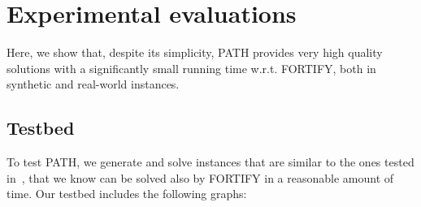 \section{Experimental evaluations}
\label{sec:experimental_evaluation}

Here, we show that, despite its simplicity, PATH provides very high quality solutions with a significantly small running time w.r.t. FORTIFY, both in synthetic and real-world instances. 

\subsection{Testbed}
To test PATH, we generate and solve instances that are similar to the ones tested in~\cite{mc2016preventing}, that we know can be solved also by FORTIFY in a reasonable amount of time. Our testbed includes the following graphs:

